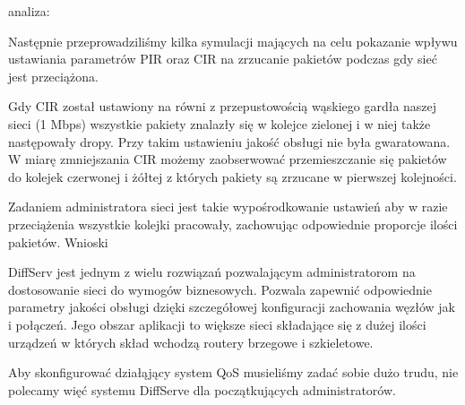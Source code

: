 \documentclass[a4paper]{article}
\begin{document}
analiza:


Następnie przeprowadziliśmy kilka symulacji mających na celu pokazanie wpływu ustawiania parametrów PIR oraz CIR na zrzucanie pakietów podczas gdy sieć jest przeciążona.

Gdy CIR został ustawiony na równi z przepustowością wąskiego gardła naszej sieci (1 Mbps) wszystkie pakiety znalazły się w kolejce zielonej i w niej także następowały dropy. Przy takim ustawieniu jakość obsługi nie była gwaratowana.
W miarę zmniejszania CIR możemy zaobserwować przemieszczanie się pakietów do kolejek czerwonej i żółtej z których pakiety są zrzucane w pierwszej kolejności.





Zadaniem administratora sieci jest takie wypośrodkowanie ustawień aby w razie przeciążenia wszystkie kolejki pracowały, zachowując odpowiednie proporcje ilości pakietów.
Wnioski


DiffServ jest jednym z wielu rozwiązań pozwalającym administratorom na dostosowanie sieci do wymogów biznesowych. Pozwala zapewnić odpowiednie parametry jakości obsługi dzięki szczegółowej konfiguracji zachowania węzłów jak i połączeń. Jego obszar aplikacji to większe sieci składające się z dużej ilości urządzeń w których skład wchodzą routery brzegowe i szkieletowe.

Aby skonfigurować działąjący system QoS musieliśmy zadać sobie dużo trudu, nie polecamy więć systemu DiffServe dla początkujących administratorów.
\end{document}
